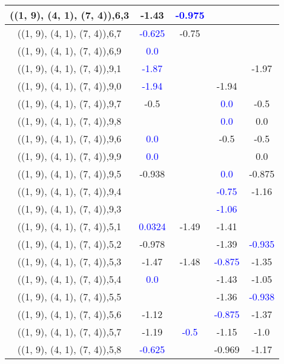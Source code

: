 \documentclass{article}
\begin{document}
\begin{center}
\begin{longtable}{|c|c|c|c|c|}
        	\hline
        	((1, 9), (4, 1), (7, 4)),6,3&-1.43& \textcolor{blue}{-0.975}&&\\
        	\hline
        	((1, 9), (4, 1), (7, 4)),6,7& \textcolor{blue}{-0.625}&-0.75&&\\
        	\hline
        	((1, 9), (4, 1), (7, 4)),6,9& \textcolor{blue}{0.0}&&&\\
        	\hline
        	((1, 9), (4, 1), (7, 4)),9,1& \textcolor{blue}{-1.87}&&&-1.97\\
        	\hline
        	((1, 9), (4, 1), (7, 4)),9,0& \textcolor{blue}{-1.94}&&-1.94&\\
        	\hline
        	((1, 9), (4, 1), (7, 4)),9,7&-0.5&& \textcolor{blue}{0.0}&-0.5\\
        	\hline
        	((1, 9), (4, 1), (7, 4)),9,8&&& \textcolor{blue}{0.0}&0.0\\
        	\hline
        	((1, 9), (4, 1), (7, 4)),9,6& \textcolor{blue}{0.0}&&-0.5&-0.5\\
        	\hline
        	((1, 9), (4, 1), (7, 4)),9,9& \textcolor{blue}{0.0}&&&0.0\\
        	\hline
        	((1, 9), (4, 1), (7, 4)),9,5&-0.938&& \textcolor{blue}{0.0}&-0.875\\
        	\hline
        	((1, 9), (4, 1), (7, 4)),9,4&&& \textcolor{blue}{-0.75}&-1.16\\
        	\hline
        	((1, 9), (4, 1), (7, 4)),9,3&&& \textcolor{blue}{-1.06}&\\
        	\hline
        	((1, 9), (4, 1), (7, 4)),5,1& \textcolor{blue}{0.0324}&-1.49&-1.41&\\
        	\hline
        	((1, 9), (4, 1), (7, 4)),5,2&-0.978&&-1.39& \textcolor{blue}{-0.935}\\
        	\hline
        	((1, 9), (4, 1), (7, 4)),5,3&-1.47&-1.48& \textcolor{blue}{-0.875}&-1.35\\
        	\hline
        	((1, 9), (4, 1), (7, 4)),5,4& \textcolor{blue}{0.0}&&-1.43&-1.05\\
        	\hline
        	((1, 9), (4, 1), (7, 4)),5,5&&&-1.36& \textcolor{blue}{-0.938}\\
        	\hline
        	((1, 9), (4, 1), (7, 4)),5,6&-1.12&& \textcolor{blue}{-0.875}&-1.37\\
        	\hline
        	((1, 9), (4, 1), (7, 4)),5,7&-1.19& \textcolor{blue}{-0.5}&-1.15&-1.0\\
        	\hline
        	((1, 9), (4, 1), (7, 4)),5,8& \textcolor{blue}{-0.625}&&-0.969&-1.17\\

\end{longtable}
\end{center}
\end{document}
